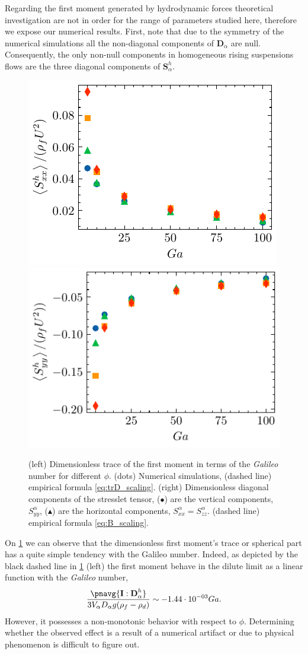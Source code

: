 Regarding the first moment generated by hydrodynamic forces theoretical investigation are not in order for the range of parameters studied here, therefore we expose our numerical results. 
First, note that due to the symmetry of the numerical simulations all the non-diagonal components of $\textbf{D}_\alpha$ are null.
Consequently, the only non-null components in homogeneous rising suspensions flows are the three diagonal components of $\textbf{S}_\alpha^h$.
\begin{figure}[h!]
    \centering
    \includegraphics[height=0.3\textwidth]{image/HOMOGENEOUS/fPA/Sxx.pdf}
    \includegraphics[height=0.3\textwidth]{image/HOMOGENEOUS/fPA/Syy.pdf}
    \caption{(left) Dimensionless trace of the first moment in terms of the \textit{Galileo} number for different $\phi$. (dots) Numerical simulations, (dashed line) empirical formula \ref{eq:trD_scaling}.
    (right) Dimensionless diagonal components of the stresslet tensor, ($\bullet$) are the vertical components, $S^\alpha_{yy}$, ($\blacktriangle$) are the horizontal components, $S^\alpha_{xx} = S^\alpha_{zz}$. (dashed line) empirical formula \ref{eq:B_scaling}.}
    \label{fig:trD_Sx_Sy}
\end{figure}
On \ref{fig:trD_Sx_Sy} we can observe that the dimensionless first moment's trace or spherical part has a quite simple tendency with the Galileo number.
Indeed, as depicted by the black dashed line in \ref{fig:trD_Sx_Sy} (left) the first moment behave in the dilute limit as a linear function with the \textit{Galileo} number, 
\begin{equation}
    \frac
    {\pnavg{\textbf{I}:\textbf{D}_\alpha^h}}
    {3V_\alpha D_\alpha g (\rho_f - \rho_d)}
    \sim  -1.44\cdot 10^{-03} Ga.
    \label{eq:trD_scaling}
\end{equation}
However, it possesses a non-monotonic behavior with respect to $\phi$. 
Determining whether the observed effect is a result of a numerical artifact or due to physical phenomenon is difficult to figure out.

